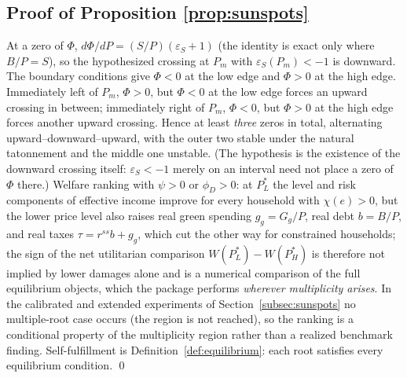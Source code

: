 \documentclass[12pt]{article}
\newcommand{\Sfun}{S}
\begin{document}
\subsection{Proof of Proposition \ref{prop:sunspots}}
At a zero of $\Phi$, $d\Phi/dP=(\Sfun/P)(\varepsilon_S+1)$ (the identity is
exact only where $B/P=\Sfun$), so the hypothesized crossing at $P_m$ with
$\varepsilon_S(P_m)<-1$ is downward. The boundary conditions give $\Phi<0$
at the low edge and $\Phi>0$ at the high edge. Immediately left of $P_m$,
$\Phi>0$, but $\Phi<0$ at the low edge forces an upward crossing in between;
immediately right of $P_m$, $\Phi<0$, but $\Phi>0$ at the high edge forces
another upward crossing. Hence at least \emph{three} zeros in total,
alternating upward--downward--upward, with the outer two stable under the
natural tatonnement and the middle one unstable. (The hypothesis is the
existence of the downward crossing itself: $\varepsilon_S<-1$ merely on an
interval need not place a zero of $\Phi$ there.) Welfare ranking with
$\psi>0$ or $\phi_D>0$: at $P_L^{*}$ the
level and risk components of effective income improve for every household
with $\chi(e)>0$, but the lower price level also raises real green spending
$g_g=G_g/P$, real debt $b=B/P$, and real taxes $\tau=r^{ss}b+g_g$, which cut
the other way for constrained households; the sign of the net utilitarian
comparison $W(P_L^{*})-W(P_H^{*})$ is therefore not implied by lower damages
alone and is a numerical comparison of the full equilibrium objects, which
the package performs \emph{wherever multiplicity arises}. In the calibrated
and extended experiments of Section~\ref{subsec:sunspots} no multiple-root
case occurs (the region is not reached), so the ranking is a conditional
property of the multiplicity region rather than a realized benchmark finding.
Self-fulfillment is Definition~\ref{def:equilibrium}: each root satisfies
every equilibrium condition. \qed
\end{document}
